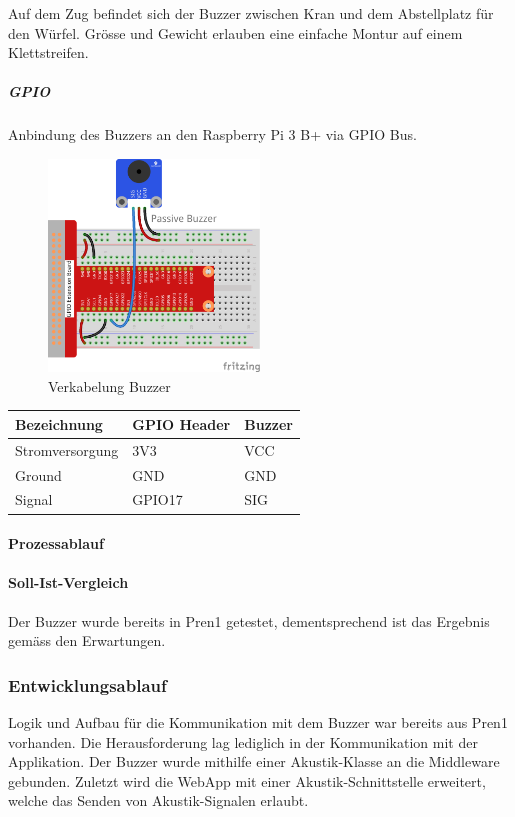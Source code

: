 \documentclass[../../main.tex]{subfiles}
\begin{document}
Auf dem Zug befindet sich der Buzzer zwischen Kran und dem Abstellplatz für den Würfel. Grösse und Gewicht erlauben eine einfache Montur auf einem Klettstreifen.

\subparagraph{GPIO}
Anbindung des Buzzers an den Raspberry Pi 3 B+ via GPIO Bus.

\begin{figure}[H] \centering
    \includegraphics[width=0.5\textwidth]{VerkabelungAkustik}
    \caption{Verkabelung Buzzer}
    \label{fig:Buzzer}
\end{figure}
\begin{table}[H]
    \begin{center}
    \begin{tabular}{lll}
    \hline
    Bezeichnung     & GPIO Header & Buzzer \\ \hline
    Stromversorgung & 3V3      & VCC    \\ \hline
    Ground          & GND      & GND    \\ \hline
    Signal          & GPIO17   & SIG    \\ \hline
    \end{tabular}
    \end{center}
\end{table}

\paragraph{Prozessablauf}

\paragraph{Soll-Ist-Vergleich}
Der Buzzer wurde bereits in Pren1 getestet, dementsprechend ist das Ergebnis gemäss den Erwartungen.

\subsubsection{Entwicklungsablauf}
Logik und Aufbau für die Kommunikation mit dem Buzzer war bereits aus Pren1 vorhanden. Die Herausforderung lag lediglich in der Kommunikation mit der Applikation. Der Buzzer wurde mithilfe einer Akustik-Klasse an die Middleware gebunden. Zuletzt wird die WebApp mit einer Akustik-Schnittstelle erweitert, welche das Senden von Akustik-Signalen erlaubt. 
\end{document}
